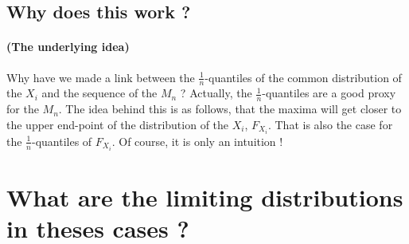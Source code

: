 \subsection{Why does this work ?}
\paragraph{(The underlying idea)}
Why have we made a link between the $\frac{1}{n}$-quantiles of the common distribution of the $X_i$ and the sequence of the $M_n$ ? Actually, the $\frac{1}{n}$-quantiles are a good proxy for the $M_n$. \newline
The idea behind this is as follows, that the maxima will get closer to the upper end-point of the distribution of the $X_i$, $F_{X_i}$. That is also the case for the $\frac{1}{n}$-quantiles of $F_{X_i}$. Of course, it is only an intuition !
\section{What are the limiting distributions in theses cases ?}
